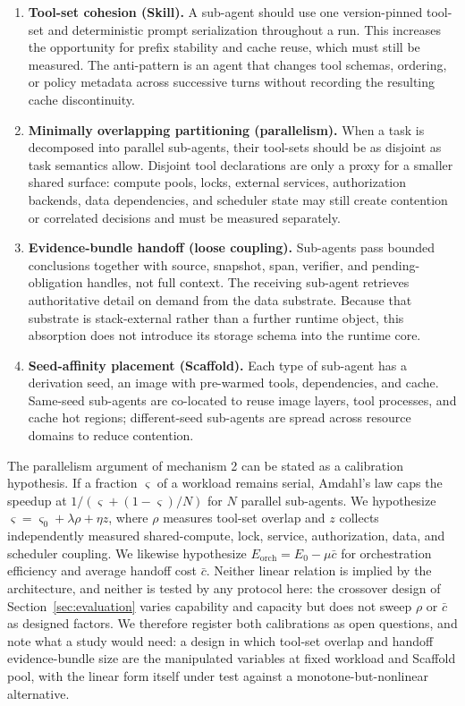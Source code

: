 \begin{enumerate}
\item \textbf{Tool-set cohesion (Skill).} A sub-agent should use one version-pinned tool-set and deterministic prompt serialization throughout a run. This increases the opportunity for prefix stability and cache reuse, which must still be measured. The anti-pattern is an agent that changes tool schemas, ordering, or policy metadata across successive turns without recording the resulting cache discontinuity.
\item \textbf{Minimally overlapping partitioning (parallelism).} When a task is decomposed into parallel sub-agents, their tool-sets should be as disjoint as task semantics allow. Disjoint tool declarations are only a proxy for a smaller shared surface: compute pools, locks, external services, authorization backends, data dependencies, and scheduler state may still create contention or correlated decisions and must be measured separately.
\item \textbf{Evidence-bundle handoff (loose coupling).} Sub-agents pass bounded conclusions together with source, snapshot, span, verifier, and pending-obligation handles, not full context. The receiving sub-agent retrieves authoritative detail on demand from the data substrate. Because that substrate is stack-external rather than a further runtime object, this absorption does not introduce its storage schema into the runtime core.
\item \textbf{Seed-affinity placement (Scaffold).} Each type of sub-agent has a derivation seed, an image with pre-warmed tools, dependencies, and cache. Same-seed sub-agents are co-located to reuse image layers, tool processes, and cache hot regions; different-seed sub-agents are spread across resource domains to reduce contention.
\end{enumerate}

The parallelism argument of mechanism 2 can be stated as a calibration hypothesis. If a fraction $\varsigma$ of a workload remains serial, Amdahl's law caps the speedup at $1/(\varsigma+(1-\varsigma)/N)$ for $N$ parallel sub-agents. We hypothesize $\varsigma=\varsigma_0+\lambda\rho+\eta z$, where $\rho$ measures tool-set overlap and $z$ collects independently measured shared-compute, lock, service, authorization, data, and scheduler coupling. We likewise hypothesize $E_{\mathrm{orch}}=E_0-\mu\bar{c}$ for orchestration efficiency and average handoff cost $\bar{c}$. Neither linear relation is implied by the architecture, and neither is tested by any protocol here: the crossover design of Section~\ref{sec:evaluation} varies capability and capacity but does not sweep $\rho$ or $\bar{c}$ as designed factors. We therefore register both calibrations as open questions, and note what a study would need: a design in which tool-set overlap and handoff evidence-bundle size are the manipulated variables at fixed workload and Scaffold pool, with the linear form itself under test against a monotone-but-nonlinear alternative.

